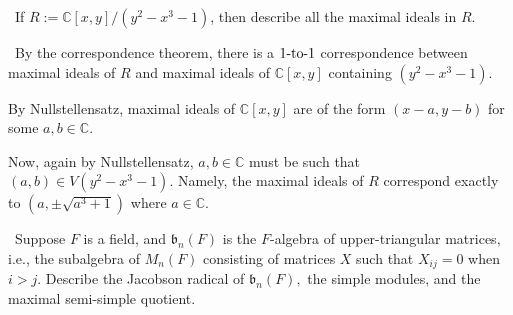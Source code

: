 \documentclass[12pt]{Qual}
\begin{document}
\begin{problem} $\,$
If $R:=\mathbb{C}[x,y]/(y^2-x^3-1)$, then describe all the maximal ideals in $R.$
\end{problem}


\begin{solution}$\,$
By the correspondence theorem, there is a $1\text{-to-}1$ correspondence between maximal ideals of $R$ and maximal ideals of $\mathbb{C}[x,y]$ containing $(y^2-x^3-1).$

By Nullstellensatz, maximal ideals of $\mathbb{C}[x,y]$ are of the form $(x-a,y-b)$ for some $a,b\in\mathbb{C}$.

Now, again by Nullstellensatz, $a,b\in\mathbb{C}$ must be such that $(a,b)\in V(y^2-x^3-1)$. Namely, the maximal ideals of $R$ correspond exactly to $(a,\pm\sqrt{a^3+1})$ where $a\in\mathbb{C}.$
\end{solution}
\newpage


\begin{problem} $\,$
Suppose $F$ is a field, and $\mathfrak{b}_n(F)$ is the $F$-algebra of upper-triangular matrices, i.e., the subalgebra of $M_n(F)$ consisting of matrices $X$ such that $X_{ij}=0$ when $i>j$. Describe the Jacobson radical of $\mathfrak{b}_n(F),$ the simple modules, and the maximal semi-simple quotient.
\end{problem}
\end{document}
